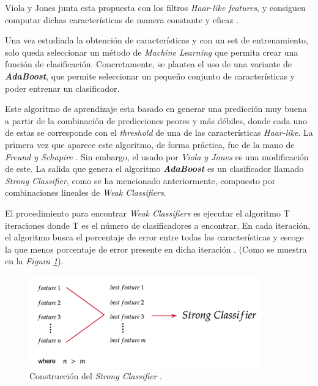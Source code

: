 Viola y Jones junta esta propuesta con los filtros \textit{Haar-like features}, y consiguen computar dichas características de manera constante y eficaz \cite{integral}.


%
Una vez estudiada la obtención de características y con un set de entrenamiento, solo queda seleccionar un método de \textit{Machine Learning} que permita crear una función de clasificación. Concretamente, se plantea el uso de una variante de \textbf{\textit{AdaBoost}}, que permite seleccionar un pequeño conjunto de características y poder entrenar un clasificador. 

Este algoritmo de aprendizaje esta basado en generar una predicción muy buena a partir de la combinación de predicciones peores y más débiles, donde cada uno de estas se corresponde con el \textit{threshold} de una de las características \textit{Haar-like}. La primera vez que aparece este algoritmo, de forma práctica, fue de la mano de \textit{Freund y Schapire} \cite{adaboost1}. Sin embargo, el usado por \textit{Viola y Jones} es una modificación de este. La salida que genera el algoritmo \textbf{\textit{AdaBoost}} es un clasificador llamado \textit{Strong Classifier}, como se ha mencionado anteriormente, compuesto por combinaciones lineales de \textit{Weak Classifiers}. 

El procedimiento para encontrar \textit{Weak Classifiers} es ejecutar el algoritmo T iteraciones donde T es el número de clasificadores a encontrar. En cada iteración, el algoritmo busca el porcentaje de error entre todas las características y escoge la que menos porcentaje de error presente en dicha iteración \cite{adaboost2}. (Como se muestra en la \textit{Figura \ref{fig:ada1}}). 

\begin{figure}[htp]
	\centering
	\includegraphics[width=10cm]{imagenes/ada1.png}
	\caption[Construcción del \textit{Strong Classifier}]{Construcción del \textit{Strong Classifier} \cite{adaboost2}.}
	\label{fig:ada1}
\end{figure}

